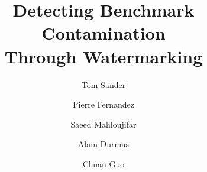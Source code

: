 \documentclass[]{fairmeta}
\title{Detecting Benchmark Contamination \\ Through Watermarking}
\author[1,2]{Tom Sander}
\author[1]{Pierre Fernandez}
\author[1]{Saeed Mahloujifar}
\author[2]{Alain Durmus}
\author[1]{Chuan Guo}
\affiliation[1]{Meta FAIR}
\affiliation[2]{\'Ecole polytechnique CMAP}
\begin{document}
\clearpage
\maketitle













\clearpage



\beginappendix

\end{document}
